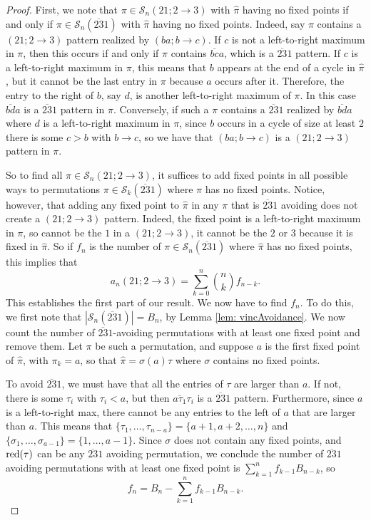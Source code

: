 \documentclass[11pt]{article}
\newcommand{\ol}[1]{\overline{#1}}
\renewcommand\S{\mathcal S}
\theoremstyle{definition}
\begin{document}
\begin{proof}
    First, we note that $\pi \in \S_n(21; 2\to3)$ with $\hat\pi$ having no fixed points if and only if $\pi \in \S_n(\ol{23}1)$ with $\hat\pi$ having no fixed points. Indeed, say $\pi$ contains a $(21; 2\to3)$ pattern realized by $(ba; b \to c)$. If $c$ is not a left-to-right maximum in $\pi$, then this occurs if and only if $\pi$ contains $\ol{bc} a$, which is a $\ol{23}1$ pattern. If $c$ is a left-to-right maximum in $\pi$, this means that $b$ appears at the end of a cycle in $\hat\pi$, but it cannot be the last entry in $\pi$ because $a$ occurs after it. Therefore, the entry to the right of $b$, say $d$, is another left-to-right maximum of $\pi$. In this case $\ol{bd}a$ is a $\ol{23}1$ pattern in $\pi$. Conversely, if such a $\pi$ contains a $\ol{23}1$ realized by $\ol{bd}a$ where $d$ is a left-to-right maximum in $\pi$, since $b$ occurs in a cycle of size at least $2$ there is some $c > b$ with $b \to c$, so we have that $(ba; b\to c)$ is a $(21; 2\to3)$ pattern in $\pi$.
    
    So to find all $\pi \in \S_n(21; 2 \to 3)$, it suffices to add fixed points in all possible ways to permutations $\pi \in \S_k(\ol{23}1)$ where $\hat\pi$ has no fixed points. Notice, however, that adding any fixed point to $\hat\pi$ in any $\pi$ that is $\ol{23}1$ avoiding does not create a $(21; 2\to 3)$ pattern. Indeed, the fixed point is a left-to-right maximum in $\pi$, so cannot be the $1$ in a $(21; 2\to 3)$, it cannot be the $2$ or $3$ because it is fixed in $\hat\pi$. So if $f_n$ is the number of $\pi \in \S_n(\ol{23}1)$ where $\hat\pi$ has no fixed points, this implies that
    \[
    a_n(21; 2 \to 3) = \sum_{k=0}^n \binom{n}{k} f_{n-k}.
    \]
    This establishes the first part of our result. We now have to find $f_n$. To do this, we first note that $|\S_n(\ol{23}1)| = B_n$, by Lemma \ref{lem: vincAvoidance}. We now count the number of $\ol{23}1$-avoiding permutations with at least one fixed point and remove them. Let $\pi$ be such a permutation, and suppose $a$ is the first fixed point of $\hat\pi$, with $\pi_k = a$, so that $\hat\pi = \sigma (a)\tau$ where $\sigma$ contains no fixed points. 
    
    To avoid $\ol{23}1$, we must have that all the entries of $\tau$ are larger than $a$. If not, there is some $\tau_i$ with $\tau_i < a$, but then $\ol{a\tau_1} \tau_i$ is a $\ol{23}1$ pattern. Furthermore, since $a$ is a left-to-right max, there cannot be any entries to the left of $a$ that are larger than $a$. This means that $\{\tau_1,\dots,\tau_{n-a}\} = \{a+1,a+2,\dots,n\}$ and $\{\sigma_1,\dots,\sigma_{a-1}\} = \{1,\dots,a-1\}$. Since $\sigma$ does not contain any fixed points, and ${\rm red}(\tau)$ can be any $\ol{23}1$ avoiding permutation, we conclude the number of $\ol{23}1$ avoiding permutations with at least one fixed point is $\sum_{k=1}^n f_{k-1}B_{n-k}$, so
    \[
    f_n = B_n - \sum_{k=1}^n f_{k-1}B_{n-k}.
    \]
\end{proof}
\end{document}
